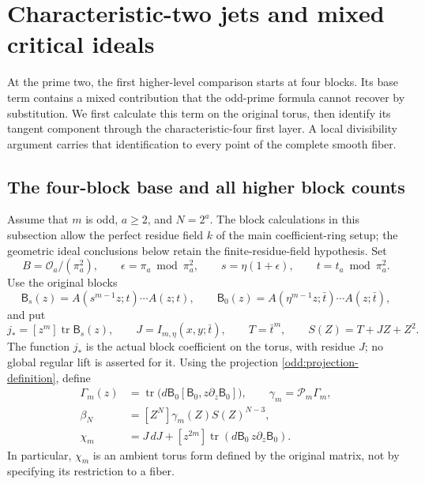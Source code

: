 \section{Characteristic-two jets and mixed critical ideals}
\label{two:section}

At the prime two, the first higher-level comparison starts at four
blocks. Its base term contains a mixed contribution that the odd-prime
formula cannot recover by substitution. We first calculate this term
on the original torus, then identify its tangent component through the
characteristic-four first layer. A local divisibility argument carries
that identification to every point of the complete smooth fiber.

\subsection{The four-block base and all higher block counts}

Assume that $m$ is odd, $a\ge2$, and $N=2^a$. The block calculations
in this subsection allow the perfect residue field $k$ of the main
coefficient-ring setup; the geometric ideal conclusions below retain
the finite-residue-field hypothesis. Set
\[
 B=\mathcal O_a/(\pi_a^2),\qquad \epsilon=\pi_a\bmod\pi_a^2,
 \qquad s=\eta(1+\epsilon),\qquad t=t_a\bmod\pi_a^2.
\]
Use the original blocks
\[
 \mathsf B_s(z)=A(s^{m-1}z;t)\cdots A(z;t),\qquad
 \mathsf B_0(z)=A(\eta^{m-1}z;\bar t)\cdots A(z;\bar t),
\]
and put
\[
 j_*=[z^m]\operatorname{tr}\mathsf B_s(z),\qquad
 J=I_{m,\eta}(x,y;\bar t),\qquad
 T=\bar t^m,\qquad S(Z)=T+JZ+Z^2.
\]
The function $j_*$ is the actual block coefficient on the torus,
with residue $J$; no global regular lift is asserted for it.
Using the projection \eqref{odd:projection-definition}, define
\begin{equation}
 \begin{split}
 \Gamma_m(z)&=\operatorname{tr}\bigl(
 d\mathsf B_0[\mathsf B_0,z\partial_z\mathsf B_0]\bigr),\qquad
 \gamma_m=\mathcal P_m\Gamma_m,\\
 \beta_N&=[Z^N]\gamma_m(Z)S(Z)^{N-3},\\
 \chi_m&=J\,dJ+[z^{2m}]\operatorname{tr}
                  (d\mathsf B_0\,z\partial_z\mathsf B_0).
 \end{split}
 \label{two:ambient-data}
\end{equation}
In particular, $\chi_m$ is an ambient torus form defined by the
original matrix, not by specifying its restriction to a fiber.

